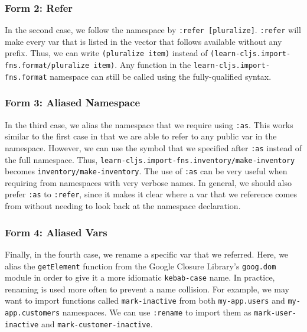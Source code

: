 \documentclass[10pt,twoside,openright]{memoir}
\begin{document}
\subsubsection{Form 2: Refer}

In the second case, we follow the namespace by
\texttt{:refer\ {[}pluralize{]}}. \texttt{:refer} will make every var
that is listed in the vector that follows available without any prefix.
Thus, we can write \texttt{(pluralize\ item)} instead of
\texttt{(learn-cljs.import-fns.format/pluralize\ item)}. Any function in
the \texttt{learn-cljs.import-fns.format} namespace can still be called
using the fully-qualified syntax.


\subsubsection{Form 3: Aliased Namespace}

In the third case, we alias the namespace that we require using
\texttt{:as}. This works similar to the first case in that we are able
to refer to any public var in the namespace. However, we can use the
symbol that we specified after \texttt{:as} instead of the full
namespace. Thus, \texttt{learn-cljs.import-fns.inventory/make-inventory}
becomes \texttt{inventory/make-inventory}. The use of \texttt{:as} can
be very useful when requiring from namespaces with very verbose names.
In general, we should also prefer \texttt{:as} to \texttt{:refer}, since
it makes it clear where a var that we reference comes from without
needing to look back at the namespace declaration.


\subsubsection{Form 4: Aliased Vars}

Finally, in the fourth case, we rename a specific var that we referred.
Here, we alias the \texttt{getElement} function from the Google Closure
Library's \texttt{goog.dom} module in order to give it a more idiomatic
\texttt{kebab-case} name. In practice, renaming is used more often to
prevent a name collision. For example, we may want to import functions
called \texttt{mark-inactive} from both \texttt{my-app.users} and
\texttt{my-app.customers} namespaces. We can use \texttt{:rename} to
import them as \texttt{mark-user-inactive} and
\texttt{mark-customer-inactive}.
\end{document}
